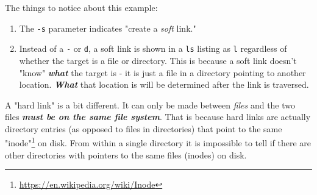 \documentclass[10pt,american,]{book}
\newenvironment{Shaded}{\begin{snugshade}}{\end{snugshade}}
\newcommand{\KeywordTok}[1]{\textcolor[rgb]{0.13,0.29,0.53}{\textbf{{#1}}}}
\newcommand{\NormalTok}[1]{{#1}}
\renewcommand{\href}[2]{#2\footnote{\url{#1}}}
\numberwithin{figure}{chapter}
\renewcommand{\KeywordTok}[1]{{#1}}
\renewcommand{\NormalTok}[1]{{#1}}
\begin{document}
\begin{Shaded}
\end{Shaded}

The things to notice about this example:

\begin{enumerate}
\def\labelenumi{\arabic{enumi}.}
\item
  The \texttt{-s} parameter indicates "create a \emph{soft} link."
\item
  Instead of a \texttt{-} or \texttt{d}, a soft link is shown in a
  \texttt{ls} listing as \texttt{l} regardless of whether the target is
  a file or directory. This is because a soft link doesn't "know"
  \textbf{\emph{what}} the target is - it is just a file in a directory
  pointing to another location. \textbf{\emph{What}} that location is
  will be determined after the link is traversed.
\end{enumerate}

A "hard link" is a bit different. It can only be made between
\emph{files} and the two files \textbf{\emph{must be on the same file
system}}. That is because hard links are actually directory entries (as
opposed to files in directories) that point to the same
\href{https://en.wikipedia.org/wiki/Inode}{"inode"} on disk. From within
a single directory it is impossible to tell if there are other
directories with pointers to the same files (inodes) on disk.
\end{document}
